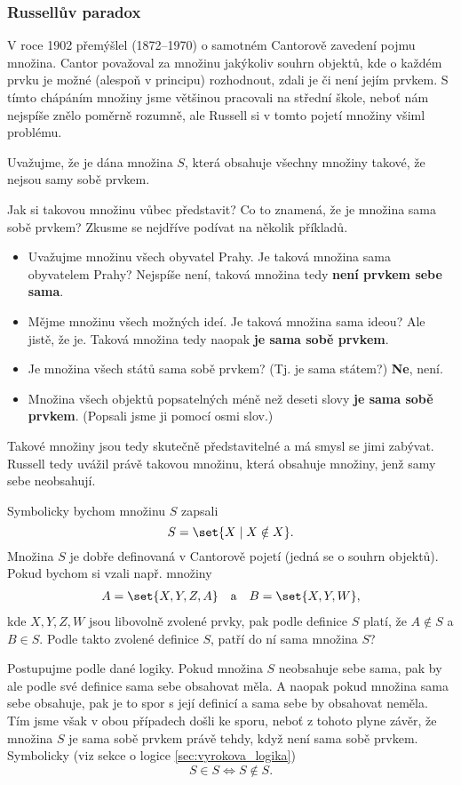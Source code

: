 \subsubsection{Russellův paradox}
V roce 1902 přemýšlel  (1872--1970) o samotném Cantorově zavedení pojmu množina. Cantor považoval za množinu jakýkoliv souhrn objektů, kde o každém prvku je možné (alespoň v principu) rozhodnout, zdali je či není jejím prvkem. S tímto chápáním množiny jsme většinou pracovali na střední škole, neboť nám nejspíše znělo poměrně rozumně, ale Russell si v tomto pojetí množiny všiml problému.\par
Uvažujme, že je dána množina $S$, která obsahuje všechny množiny takové, že nejsou samy sobě prvkem.\par
Jak si takovou množinu vůbec představit? Co to znamená, že je množina sama sobě prvkem? Zkusme se nejdříve podívat na několik příkladů.
\begin{itemize}
    \item Uvažujme množinu všech obyvatel Prahy. Je taková množina sama obyvatelem Prahy? Nejspíše není, taková množina tedy \textbf{není prvkem sebe sama}.
    \item Mějme množinu všech možných ideí. Je taková množina sama ideou? Ale jistě, že je. Taková množina tedy naopak \textbf{je sama sobě prvkem}.
    \item Je množina všech států sama sobě prvkem? (Tj. je sama státem?) \textbf{Ne}, není.
    \item Množina všech objektů popsatelných méně než deseti slovy \textbf{je sama sobě prvkem}. (Popsali jsme ji pomocí osmi slov.)
\end{itemize}
Takové množiny jsou tedy skutečně představitelné a má smysl se jimi zabývat. Russell tedy uvážil právě takovou množinu, která obsahuje množiny, jenž samy sebe neobsahují.

Symbolicky bychom množinu $S$ zapsali
\begin{equation*}
S=\set{X \mid X \notin X}.
\end{equation*}
Množina $S$ je dobře definovaná v Cantorově pojetí (jedná se o souhrn objektů). Pokud bychom si vzali např. množiny
\begin{align*}
A=\set{X,Y,Z,A} \quad \text{a} \quad B=\set{X,Y,W},
\end{align*}
kde $X,Y,Z,W$ jsou libovolně zvolené prvky, pak podle definice $S$ platí, že $A \notin S$ a $B \in S$. Podle takto zvolené definice $S$, patří do ní sama množina $S$?\par
Postupujme podle dané logiky. Pokud množina $S$ neobsahuje sebe sama, pak by ale podle své definice sama sebe obsahovat měla. A naopak pokud množina sama sebe obsahuje, pak je to spor s její definicí a sama sebe by obsahovat neměla. Tím jsme však v obou případech došli ke sporu, neboť z tohoto plyne závěr, že množina $S$ je sama sobě prvkem právě tehdy, když není sama sobě prvkem. Symbolicky (viz sekce o logice \ref{sec:vyrokova_logika})
\begin{equation*}
S \in S \iff S \notin S.
\end{equation*}

